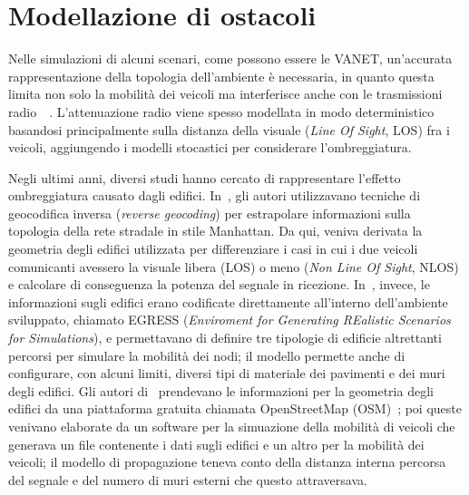 \section{Modellazione di ostacoli}
Nelle simulazioni di alcuni scenari, come possono essere le VANET, un'accurata rappresentazione della topologia dell'ambiente è necessaria,
in quanto questa limita non solo la mobilità dei veicoli ma interferisce anche con le trasmissioni radio~\cite{7543980}~\cite{amjad2015impact}.
L'attenuazione radio viene spesso modellata in modo deterministico basandosi principalmente sulla distanza della visuale (\textit{Line Of Sight}, LOS)
fra i veicoli, aggiungendo i modelli stocastici per considerare l'ombreggiatura.

Negli ultimi anni, diversi studi hanno cercato di rappresentare l'effetto ombreggiatura causato dagli edifici.
In~\cite{Giordano:2010:CST:1860058.1860065}, gli autori utilizzavano tecniche di geocodifica inversa (\textit{reverse geocoding}) per estrapolare
informazioni sulla topologia della rete stradale in stile Manhattan. Da qui, veniva derivata la geometria degli edifici utilizzata
per differenziare i casi in cui i due veicoli comunicanti avessero la visuale libera (LOS) o meno (\textit{Non Line Of Sight}, NLOS)
e calcolare di conseguenza la potenza del segnale in ricezione.
In~\cite{4020783}, invece, le informazioni sugli edifici erano codificate direttamente all'interno dell'ambiente sviluppato, chiamato
EGRESS (\textit{Enviroment for Generating REalistic Scenarios for Simulations}), e permettavano di definire tre tipologie di edificie altrettanti
percorsi per simulare la mobilità dei nodi; il modello permette anche di configurare, con alcuni limiti, diversi tipi di materiale dei pavimenti e dei muri degli edifici.
Gli autori di~\cite{Carpenter:2015:OMI:2756509.2756512} prendevano le informazioni per la geometria degli edifici da una piattaforma gratuita
chiamata OpenStreetMap (OSM)~\cite{osmWebsite}; poi queste venivano elaborate da un software per la simuazione della mobilità di veicoli
che generava un file contenente i dati sugli edifici e un altro per la mobilità dei veicoli;
il modello di propagazione teneva conto della distanza interna percorsa del segnale e del numero di muri esterni che questo attraversava.
